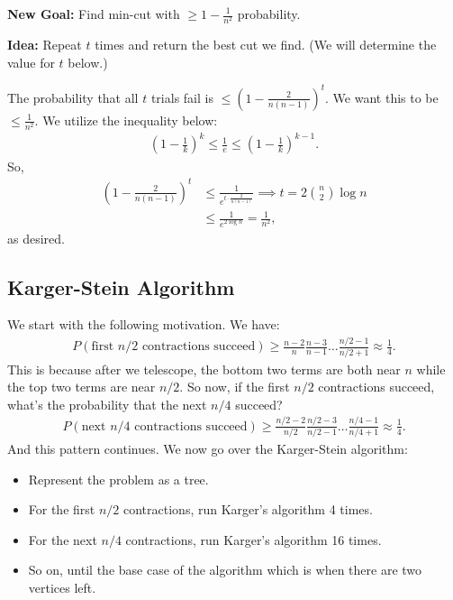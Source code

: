 \documentclass{report}
\begin{document}
\noindent \textbf{New Goal:} Find min-cut with $\geq 1 - \frac{1}{n^2}$ probability. 

\noindent \textbf{Idea:} Repeat $t$ times and return the best cut we find. (We will determine the value for $t$ below.)

The probability that all $t$ trials fail is $\leq \left(1 - \frac{2}{n(n-1)}\right)^t$. We want this to be $\leq \frac{1}{n^2}$. We utilize the inequality below:
\begin{align*}
    \left(1 - \frac 1k\right)^k \leq \frac 1e \leq \left( 1 - \frac 1k\right)^{k-1}.
\end{align*}
So,
\begin{align*}
    \left(1 - \frac{2}{n(n-1)}\right)^t &\leq \frac{1}{e^{t \cdot \frac{2}{n(n-1)}}}\implies t = 2\binom n2 \log n \\
    &\leq \frac{1}{e^{2\log n}} = \frac 1{n^2},
\end{align*}
as desired. 
\subsection{Karger-Stein Algorithm}
We start with the following motivation. We have:
\begin{align*}
    P(\text{first }n/2 \text{ contractions succeed}) \geq \frac{n-2}{n} \frac{n-3}{n-1} \ldots \frac{n/2 - 1}{n/2 + 1} \approx \frac{1}{4}.
\end{align*}
This is because after we telescope, the bottom two terms are both near $n$ while the top two terms are near $n/2$. So now, if the first $n/2$ contractions succeed, what's the probability that the next $n/4$ succeed?
\begin{align*}
    P(\text{next }n/4 \text{ contractions succeed}) \geq \frac{n/2 - 2}{n/2} \frac{n/2 - 3}{n/2 - 1} \ldots \frac{n/4 - 1}{n/4 + 1} \approx \frac{1}{4}.
\end{align*}
And this pattern continues. 
\newpage \noindent We now go over the Karger-Stein algorithm:
\begin{itemize}
    \item Represent the problem as a tree.
    \item For the first $n/2$ contractions, run Karger's algorithm 4 times.
    \item For the next $n/4$ contractions, run Karger's algorithm 16 times.
    \item So on, until the base case of the algorithm which is when there are two vertices left. 
\end{itemize}
\end{document}
